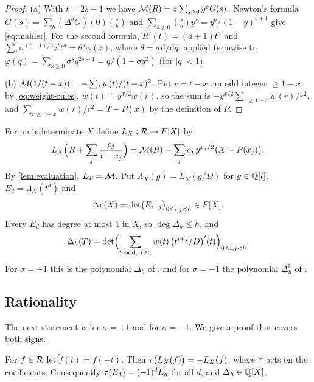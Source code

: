 \begin{proof}
(a) With $t=2s+1$ we have $\mathcal{M}(R)=z\sum_{s\ge0}y^sG(s)$. Newton's formula
$G(s)=\sum_b(\Delta^bG)(0)\binom sb$ and $\sum_{s\ge0}\binom sby^s=y^b/(1-y)^{b+1}$ give
\eqref{eq:mahler}. For the second formula, $R'(t)=(a+1)t^a$ and $\sum_{t}\sigma^{(t-1)/2}z^t t^a=\theta^a\varphi(z)$,
where $\theta=q\,\mathrm d/\mathrm dq$, applied termwise to $\varphi(q)=\sum_{s\ge0}\sigma^sq^{2s+1}=q/(1-\sigma q^2)$
(for $|q|<1$).

(b) $\mathcal{M}(1/(t-x))=-\sum_tw(t)/(t-x)^2$. Put $r=t-x$, an odd integer $\ge1-x$; by
\eqref{eq:weight-rules}, $w(t)=y^{x/2}w(r)$, so the sum is $-y^{x/2}\sum_{r\ge1-x}w(r)/r^2$, and
$\sum_{r\ge1-x}w(r)/r^2=T-P(x)$ by the definition of $P$.
\end{proof}

For an indeterminate $X$ define $L_X:\mathcal{R}\to F[X]$ by
\begin{equation}\label{eq:LX}
L_X\Bigl(R+\sum_j\frac{c_j}{t-x_j}\Bigr)=\mathcal{M}(R)-\sum_jc_j\,y^{x_j/2}\bigl(X-P(x_j)\bigr).
\end{equation}
By \cref{lem:evaluation}, $L_T=\mathcal{M}$. Put $\Lambda_X(g)=L_X(g/D)$ for $g\in\mathbb{Q}[t]$,
$E_d=\Lambda_X(t^d)$ and
\[
\Delta_h(X)=\det\bigl(E_{i+j}\bigr)_{0\le i,j<h}\in F[X].
\]
Every $E_d$ has degree at most $1$ in $X$, so $\deg\Delta_h\le h$, and
\begin{equation}\label{eq:value-at-T}
\Delta_h(T)=\det\Bigl(\sum_{t\ \mathrm{odd},\ t\ge1}w(t)\,\bigl(t^{i+j}/D\bigr)'(t)\Bigr)_{0\le i,j<h}.
\end{equation}
For $\sigma=+1$ this is the polynomial $\Delta_h$ of \cite[Section~2]{Krisman2026units}, and for
$\sigma=-1$ the polynomial $\Delta_h^{\natural}$ of \cite[Section~8.2]{Krisman2026units}.

\subsection{Rationality}\label{subsec:rationality}

The next statement is \cite[Lemma~2.2 and Corollary~2.3]{Krisman2026units} for $\sigma=+1$ and
\cite[Lemma~8.4]{Krisman2026units} for $\sigma=-1$. We give a proof that covers both signs.

\begin{proposition}\label{prop:rationality}
For $f\in\mathcal{R}$ let $\tilde f(t)=f(-t)$. Then $\tau\bigl(L_X(f)\bigr)=-L_X(\tilde f)$, where
$\tau$ acts on the coefficients. Consequently $\tau(E_d)=(-1)^dE_d$ for all $d$, and
$\Delta_h\in\mathbb{Q}[X]$.
\end{proposition}

